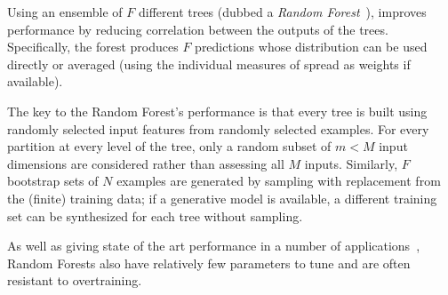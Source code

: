 \label{s:rf_background}


Using an ensemble of $F$ different trees (dubbed a \emph{Random Forest}~\cite{Breiman_ML01}), improves performance by reducing correlation between the outputs of the trees. Specifically, the forest produces $F$ predictions whose distribution can be used directly or averaged (using the individual measures of spread as weights if available).

The key to the Random Forest's performance is that every tree is built using randomly selected input features from randomly selected examples. For every partition at every level of the tree, only a random subset of $m < M$ input dimensions are considered rather than assessing all $M$ inputs. Similarly, $F$ bootstrap sets of $N$ examples are generated by sampling with replacement from the (finite) training data; if a generative model is available, a different training set can be synthesized for each tree without sampling.

As well as giving state of the art performance in a number of applications~\cite{Criminisi}, Random Forests also have relatively few parameters to tune and are often resistant to overtraining.
